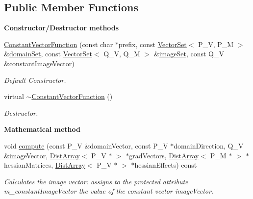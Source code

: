 \subsection*{Public Member Functions}
\begin{Indent}{\bf Constructor/\-Destructor methods}\par
\begin{DoxyCompactItemize}
\item 
\hyperlink{class_q_u_e_s_o_1_1_constant_vector_function_a71f9a54dfabba7ae9b8c0f5f90b3d528}{Constant\-Vector\-Function} (const char $\ast$prefix, const \hyperlink{class_q_u_e_s_o_1_1_vector_set}{Vector\-Set}$<$ P\-\_\-\-V, P\-\_\-\-M $>$ \&\hyperlink{class_q_u_e_s_o_1_1_base_vector_function_af77b709d473f253e5c56aa620d5f3cb0}{domain\-Set}, const \hyperlink{class_q_u_e_s_o_1_1_vector_set}{Vector\-Set}$<$ Q\-\_\-\-V, Q\-\_\-\-M $>$ \&\hyperlink{class_q_u_e_s_o_1_1_base_vector_function_aa3a070a86f7099f53a669f1aab547619}{image\-Set}, const Q\-\_\-\-V \&constant\-Image\-Vector)
\begin{DoxyCompactList}\small\item\em Default Constructor. \end{DoxyCompactList}\item 
virtual \hyperlink{class_q_u_e_s_o_1_1_constant_vector_function_a3be303448d27a3a98910f575a8a9876c}{$\sim$\-Constant\-Vector\-Function} ()
\begin{DoxyCompactList}\small\item\em Destructor. \end{DoxyCompactList}\end{DoxyCompactItemize}
\end{Indent}
\begin{Indent}{\bf Mathematical method}\par
\begin{DoxyCompactItemize}
\item 
void \hyperlink{class_q_u_e_s_o_1_1_constant_vector_function_a22d15ef82a6284e234364a9f5c176a89}{compute} (const P\-\_\-\-V \&domain\-Vector, const P\-\_\-\-V $\ast$domain\-Direction, Q\-\_\-\-V \&image\-Vector, \hyperlink{class_q_u_e_s_o_1_1_dist_array}{Dist\-Array}$<$ P\-\_\-\-V $\ast$ $>$ $\ast$grad\-Vectors, \hyperlink{class_q_u_e_s_o_1_1_dist_array}{Dist\-Array}$<$ P\-\_\-\-M $\ast$ $>$ $\ast$hessian\-Matrices, \hyperlink{class_q_u_e_s_o_1_1_dist_array}{Dist\-Array}$<$ P\-\_\-\-V $\ast$ $>$ $\ast$hessian\-Effects) const 
\begin{DoxyCompactList}\small\item\em Calculates the image vector\-: assigns to the protected attribute {\ttfamily m\-\_\-constant\-Image\-Vector} the value of the constant vector {\ttfamily image\-Vector}. \end{DoxyCompactList}\end{DoxyCompactItemize}
\end{Indent}
